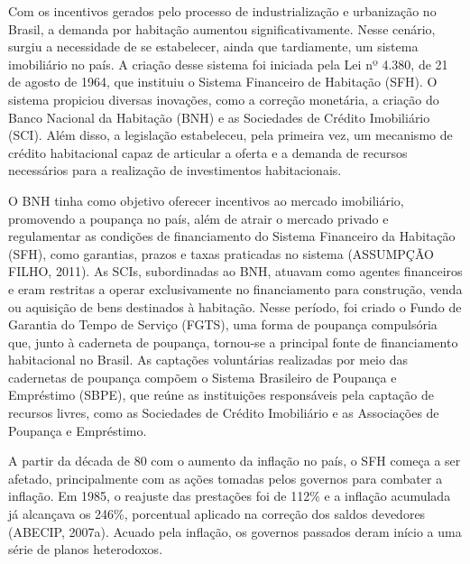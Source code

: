 \documentclass[
  12pt,
  a4paper,
]{scrreprt}
\begin{document}
\vspace{12pt}

Com os incentivos gerados pelo processo de industrialização e
urbanização no Brasil, a demanda por habitação aumentou
significativamente. Nesse cenário, surgiu a necessidade de se
estabelecer, ainda que tardiamente, um sistema imobiliário no país. A
criação desse sistema foi iniciada pela Lei nº 4.380, de 21 de agosto de
1964, que instituiu o Sistema Financeiro de Habitação (SFH). O sistema
propiciou diversas inovações, como a correção monetária, a criação do
Banco Nacional da Habitação (BNH) e as Sociedades de Crédito Imobiliário
(SCI). Além disso, a legislação estabeleceu, pela primeira vez, um
mecanismo de crédito habitacional capaz de articular a oferta e a
demanda de recursos necessários para a realização de investimentos
habitacionais.

\vspace{12pt}

O BNH tinha como objetivo oferecer incentivos ao mercado imobiliário,
promovendo a poupança no país, além de atrair o mercado privado e
regulamentar as condições de financiamento do Sistema Financeiro da
Habitação (SFH), como garantias, prazos e taxas praticadas no sistema
(ASSUMPÇÃO FILHO, 2011). As SCIs, subordinadas ao BNH, atuavam como
agentes financeiros e eram restritas a operar exclusivamente no
financiamento para construção, venda ou aquisição de bens destinados à
habitação. Nesse período, foi criado o Fundo de Garantia do Tempo de
Serviço (FGTS), uma forma de poupança compulsória que, junto à caderneta
de poupança, tornou-se a principal fonte de financiamento habitacional
no Brasil. As captações voluntárias realizadas por meio das cadernetas
de poupança compõem o Sistema Brasileiro de Poupança e Empréstimo
(SBPE), que reúne as instituições responsáveis pela captação de recursos
livres, como as Sociedades de Crédito Imobiliário e as Associações de
Poupança e Empréstimo.

\vspace{12pt}

A partir da década de 80 com o aumento da inflação no país, o SFH começa
a ser afetado, principalmente com as ações tomadas pelos governos para
combater a inflação. Em 1985, o reajuste das prestações foi de 112\% e a
inflação acumulada já alcançava os 246\%, porcentual aplicado na
correção dos saldos devedores (ABECIP, 2007a). Acuado pela inflação, os
governos passados deram início a uma série de planos heterodoxos.

\vspace{12pt}
\end{document}

